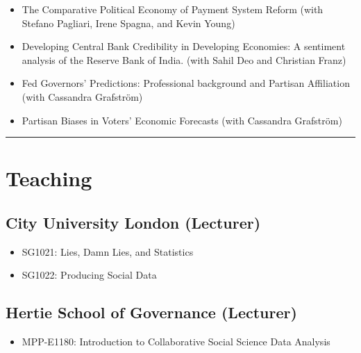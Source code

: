 \documentclass[a4paper]{article}
\begin{document}
{\begin{itemize}
    \item The Comparative Political Economy of Payment System Reform (with Stefano Pagliari, Irene Spagna, and Kevin Young)

    \item Developing Central Bank Credibility in Developing Economies: A sentiment
    analysis of the Reserve Bank of India. (with Sahil Deo and Christian Franz)

    \item Fed Governors' Predictions: Professional background and Partisan Affiliation (with Cassandra Grafstr\"{o}m)

    \item Partisan Biases in Voters' Economic Forecasts (with Cassandra Grafstr\"{o}m)

\end{itemize}


\vspace{0.25cm}
\medskip\hrule height 1pt
\vspace{0.5cm}

\section*{Teaching}

\subsection*{City University London (Lecturer)}

\begin{itemize}
    \item SG1021: Lies, Damn Lies, and Statistics

    \item SG1022: Producing Social Data
\end{itemize}

\subsection*{Hertie School of Governance (Lecturer)}

\begin{itemize}

    \item MPP-E1180: Introduction to Collaborative Social Science Data Analysis

\end{itemize}

}
\end{document}
